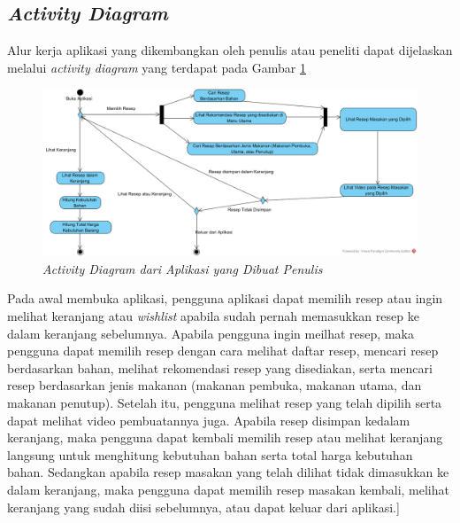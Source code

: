 	\subsection{\emph{Activity Diagram}}
		Alur kerja aplikasi yang dikembangkan oleh penulis atau peneliti dapat dijelaskan melalui \textit{activity diagram} yang terdapat pada Gambar \ref{Activity Diagram1}
		\begin{figure}[H]
			\centering
			\includegraphics[origin=c,width=1\textwidth]{gambar/activity_diagram_v2}
			\caption{\emph{Activity Diagram dari Aplikasi yang Dibuat Penulis}}
			\label{Activity Diagram1}
		\end{figure}
		 Pada awal membuka aplikasi, pengguna aplikasi dapat memilih resep atau ingin melihat keranjang atau \textit{wishlist} apabila sudah pernah memasukkan resep ke dalam keranjang sebelumnya. Apabila pengguna ingin meilhat resep, maka pengguna dapat memilih resep dengan cara melihat daftar resep, mencari resep berdasarkan bahan, melihat rekomendasi resep yang disediakan, serta mencari resep berdasarkan jenis makanan (makanan pembuka, makanan utama, dan makanan penutup). Setelah itu, pengguna melihat resep yang telah dipilih serta dapat melihat video pembuatannya juga. Apabila resep disimpan kedalam keranjang, maka pengguna dapat kembali memilih resep atau melihat keranjang langsung untuk menghitung kebutuhan bahan serta total harga kebutuhan bahan. Sedangkan apabila resep masakan yang telah dilihat tidak dimasukkan ke dalam keranjang, maka pengguna dapat memilih resep masakan kembali, melihat keranjang yang sudah diisi sebelumnya, atau dapat keluar dari aplikasi.] 
